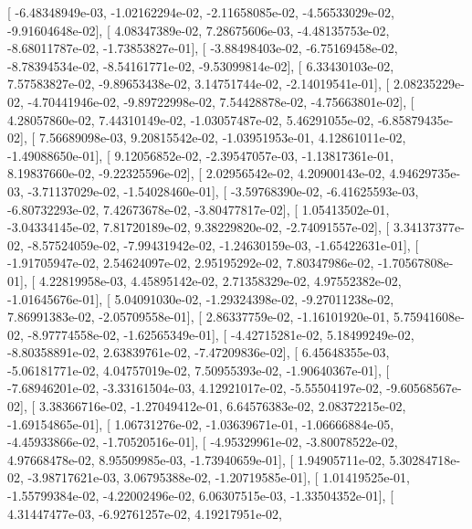 \documentclass{article}
\begin{document}
       [ -6.48348949e-03,  -1.02162294e-02,  -2.11658085e-02,
         -4.56533029e-02,  -9.91604648e-02],
       [  4.08347389e-02,   7.28675606e-03,  -4.48135753e-02,
         -8.68011787e-02,  -1.73853827e-01],
       [ -3.88498403e-02,  -6.75169458e-02,  -8.78394534e-02,
         -8.54161771e-02,  -9.53099814e-02],
       [  6.33430103e-02,   7.57583827e-02,  -9.89653438e-02,
          3.14751744e-02,  -2.14019541e-01],
       [  2.08235229e-02,  -4.70441946e-02,  -9.89722998e-02,
          7.54428878e-02,  -4.75663801e-02],
       [  4.28057860e-02,   7.44310149e-02,  -1.03057487e-02,
          5.46291055e-02,  -6.85879435e-02],
       [  7.56689098e-03,   9.20815542e-02,  -1.03951953e-01,
          4.12861011e-02,  -1.49088650e-01],
       [  9.12056852e-02,  -2.39547057e-03,  -1.13817361e-01,
          8.19837660e-02,  -9.22325596e-02],
       [  2.02956542e-02,   4.20900143e-02,   4.94629735e-03,
         -3.71137029e-02,  -1.54028460e-01],
       [ -3.59768390e-02,  -6.41625593e-03,  -6.80732293e-02,
          7.42673678e-02,  -3.80477817e-02],
       [  1.05413502e-01,  -3.04334145e-02,   7.81720189e-02,
          9.38229820e-02,  -2.74091557e-02],
       [  3.34137377e-02,  -8.57524059e-02,  -7.99431942e-02,
         -1.24630159e-03,  -1.65422631e-01],
       [ -1.91705947e-02,   2.54624097e-02,   2.95195292e-02,
          7.80347986e-02,  -1.70567808e-01],
       [  4.22819958e-03,   4.45895142e-02,   2.71358329e-02,
          4.97552382e-02,  -1.01645676e-01],
       [  5.04091030e-02,  -1.29324398e-02,  -9.27011238e-02,
          7.86991383e-02,  -2.05709558e-01],
       [  2.86337759e-02,  -1.16101920e-01,   5.75941608e-02,
         -8.97774558e-02,  -1.62565349e-01],
       [ -4.42715281e-02,   5.18499249e-02,  -8.80358891e-02,
          2.63839761e-02,  -7.47209836e-02],
       [  6.45648355e-03,  -5.06181771e-02,   4.04757019e-02,
          7.50955393e-02,  -1.90640367e-01],
       [ -7.68946201e-02,  -3.33161504e-03,   4.12921017e-02,
         -5.55504197e-02,  -9.60568567e-02],
       [  3.38366716e-02,  -1.27049412e-01,   6.64576383e-02,
          2.08372215e-02,  -1.69154865e-01],
       [  1.06731276e-02,  -1.03639671e-01,  -1.06666884e-05,
         -4.45933866e-02,  -1.70520516e-01],
       [ -4.95329961e-02,  -3.80078522e-02,   4.97668478e-02,
          8.95509985e-03,  -1.73940659e-01],
       [  1.94905711e-02,   5.30284718e-02,  -3.98717621e-03,
          3.06795388e-02,  -1.20719585e-01],
       [  1.01419525e-01,  -1.55799384e-02,  -4.22002496e-02,
          6.06307515e-03,  -1.33504352e-01],
       [  4.31447477e-03,  -6.92761257e-02,   4.19217951e-02,
\end{document}
